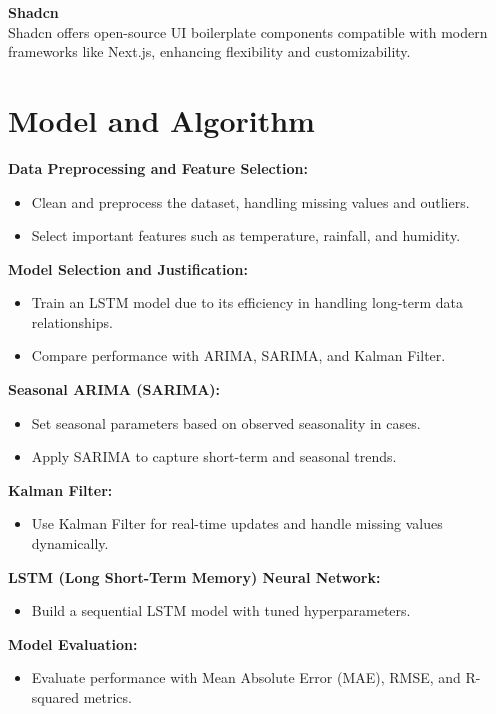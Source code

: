 \textbf{Shadcn} \\
Shadcn offers open-source UI boilerplate components compatible with modern frameworks like Next.js, enhancing flexibility and customizability.

\section{Model and Algorithm}
\textbf{Data Preprocessing and Feature Selection:}
\begin{itemize}
	\item Clean and preprocess the dataset, handling missing values and outliers.
	\item Select important features such as temperature, rainfall, and humidity.
\end{itemize}

\textbf{Model Selection and Justification:}
\begin{itemize}
	\item Train an LSTM model due to its efficiency in handling long-term data relationships.
	\item Compare performance with ARIMA, SARIMA, and Kalman Filter.
\end{itemize}

\textbf{Seasonal ARIMA (SARIMA):}
\begin{itemize}
	\item Set seasonal parameters based on observed seasonality in cases.
	\item Apply SARIMA to capture short-term and seasonal trends.
\end{itemize}

\textbf{Kalman Filter:}
\begin{itemize}
	\item Use Kalman Filter for real-time updates and handle missing values dynamically.
\end{itemize}

\textbf{LSTM (Long Short-Term Memory) Neural Network:}
\begin{itemize}
	\item Build a sequential LSTM model with tuned hyperparameters.
\end{itemize}

\textbf{Model Evaluation:}
\begin{itemize}
	\item Evaluate performance with Mean Absolute Error (MAE), RMSE, and R-squared metrics.
\end{itemize}

